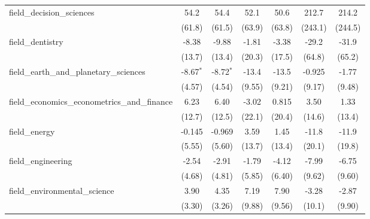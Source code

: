 \begin{tabular}{lcccccc}
   field\_decision\_sciences                                   & 54.2          & 54.4          & 52.1           & 50.6          & 212.7         & 214.2\\   
                                                               & (61.8)        & (61.5)        & (63.9)         & (63.8)        & (243.1)       & (244.5)\\   
   field\_dentistry                                            & -8.38         & -9.88         & -1.81          & -3.38         & -29.2         & -31.9\\   
                                                               & (13.7)        & (13.4)        & (20.3)         & (17.5)        & (64.8)        & (65.2)\\   
   field\_earth\_and\_planetary\_sciences                      & -8.67$^{*}$   & -8.72$^{*}$   & -13.4          & -13.5         & -0.925        & -1.77\\   
                                                               & (4.57)        & (4.54)        & (9.55)         & (9.21)        & (9.17)        & (9.48)\\   
   field\_economics\_econometrics\_and\_finance                & 6.23          & 6.40          & -3.02          & 0.815         & 3.50          & 1.33\\   
                                                               & (12.7)        & (12.5)        & (22.1)         & (20.4)        & (14.6)        & (13.4)\\   
   field\_energy                                               & -0.145        & -0.969        & 3.59           & 1.45          & -11.8         & -11.9\\   
                                                               & (5.55)        & (5.60)        & (13.7)         & (13.4)        & (20.1)        & (19.8)\\   
   field\_engineering                                          & -2.54         & -2.91         & -1.79          & -4.12         & -7.99         & -6.75\\   
                                                               & (4.68)        & (4.81)        & (5.85)         & (6.40)        & (9.62)        & (9.60)\\   
   field\_environmental\_science                               & 3.90          & 4.35          & 7.19           & 7.90          & -3.28         & -2.87\\   
                                                               & (3.30)        & (3.26)        & (9.88)         & (9.56)        & (10.1)        & (9.90)\\   

\end{tabular}
